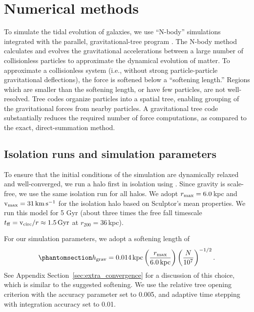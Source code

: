\section{Numerical methods}\label{numerical-methods}

To simulate the tidal evolution of galaxies, we use ``N-body''
simulations integrated with the parallel, gravitational-tree program
\gadget{} \citep{gadget4}. The N-body method calculates and evolves the
gravitational accelerations between a large number of collisionless
particles to approximate the dynamical evolution of matter. To
approximate a collisionless system (i.e., without strong
particle-particle gravitational deflections), the force is softened
below a ``softening length.'' Regions which are smaller than the
softening length, or have few particles, are not well-resolved. Tree
codes organize particles into a spatial tree, enabling grouping of the
gravitational forces from nearby particles. A gravitational tree code
substantially reduces the required number of force computations, as
compared to the exact, direct-summation method.

\subsection{Isolation runs and simulation
parameters}\label{isolation-runs-and-simulation-parameters}

To ensure that the initial conditions of the simulation are dynamically
relaxed and well-converged, we run a halo first in isolation using
\gadget{}. Since gravity is scale-free, we use the same isolation run
for all halos. We adopt \(r_{\rm max} = 6.0\,\)kpc and \({\rm v}_{\rm max} = 31\,{\rm km\,s^{-1}}\)
for the isolation halo based on Sculptor's mean properties. We run this
model for 5 Gyr (about three times the free fall timescale
\(t_{\rm ff} = {\rm v}_{\rm circ} / r \approx 1.5\,{\rm Gyr}\) at \(r_{200}=36\,\)kpc).

For our simulation parameters, we adopt a softening length of
\begin{equation}\protect\phantomsection\label{eq:softening_length}{
h_{\rm grav} = 0.014\,{\rm kpc}\left(\frac{r_{\rm max}}{6.0\,{\rm kpc}}\right)\left(\frac{N}{10^7}\right)^{-1/2}.
}\end{equation} See Appendix Section~\ref{sec:extra_convergence} for a
discussion of this choice, which is similar to the \citet{power+2003}
suggested softening. We use the relative tree opening criterion with the
accuracy parameter set to 0.005, and adaptive time stepping with
integration accuracy set to 0.01.

